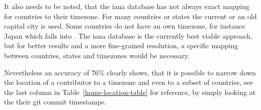 It also needs to be noted, that the \ac{iana} database has not always exact mapping for countries to their timezone.
For many countries or states the current or an old capital city is used.
Some countries do not have an own timezone, for instance Japan which falls into .
The \ac{iana} database is the currently best viable approach, but for better results and a more fine-grained resolution, a specific mapping between countries, states and timezones would be necessary.

Nevertheless an accuracy of 76\% clearly shows, that it is possible to narrow down the location of a contributor to a timezone and even to a subset of countries, see the last column in Table~\ref{home-location-table} for reference, by simply looking at the their git commit timestamps.
